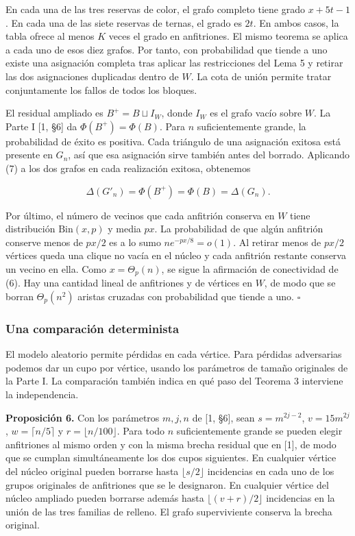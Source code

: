 \documentclass[spanish,11pt,a4paper]{article}
\begin{document}
En cada una de las tres reservas de color, el grafo completo tiene grado \(x+5t-1\). En cada una de las siete reservas de ternas, el grado es \(2t\). En ambos casos, la tabla ofrece al menos \(K\) veces el grado en anfitriones. El mismo teorema se aplica a cada uno de esos diez grafos. Por tanto, con probabilidad que tiende a uno existe una asignación completa tras aplicar las restricciones del Lema 5 y retirar las dos asignaciones duplicadas dentro de \(W\). La cota de unión permite tratar conjuntamente los fallos de todos los bloques.

El residual ampliado es \(B^+=B\sqcup I_W\), donde \(I_W\) es el grafo vacío sobre \(W\). La Parte I {[}1, §6{]} da \(\Phi(B^+)=\Phi(B)\). Para \(n\) suficientemente grande, la probabilidad de éxito es positiva. Cada triángulo de una asignación exitosa está presente en \(G_n\), así que esa asignación sirve también antes del borrado. Aplicando (7) a los dos grafos en cada realización exitosa, obtenemos

\[\Delta(G'_n)=\Phi(B^+)=\Phi(B)=\Delta(G_n).\]

Por último, el número de vecinos que cada anfitrión conserva en \(W\) tiene distribución \(\mathrm{Bin}(x,p)\) y media \(px\). La probabilidad de que algún anfitrión conserve menos de \(px/2\) es a lo sumo \(ne^{-px/8}=o(1)\). Al retirar menos de \(px/2\) vértices queda una clique no vacía en el núcleo y cada anfitrión restante conserva un vecino en ella. Como \(x=\Theta_p(n)\), se sigue la afirmación de conectividad de (6). Hay una cantidad lineal de anfitriones y de vértices en \(W\), de modo que se borran \(\Theta_p(n^2)\) aristas cruzadas con probabilidad que tiende a uno. \(\square\)

\subsubsection{Una comparación determinista}\label{una-comparaciuxf3n-determinista}

El modelo aleatorio permite pérdidas en cada vértice. Para pérdidas adversarias podemos dar un cupo por vértice, usando los parámetros de tamaño originales de la Parte I. La comparación también indica en qué paso del Teorema 3 interviene la independencia.

\textbf{Proposición 6.} Con los parámetros \(m,j,n\) de {[}1, §6{]}, sean \(s=m^{2j-2}\), \(v=15m^{2j}\), \(w=\lceil n/5\rceil\) y \(r=\lfloor n/100\rfloor\). Para todo \(n\) suficientemente grande se pueden elegir anfitriones al mismo orden y con la misma brecha residual que en {[}1{]}, de modo que se cumplan simultáneamente los dos cupos siguientes. En cualquier vértice del núcleo original pueden borrarse hasta \(\lfloor s/2\rfloor\) incidencias en cada uno de los grupos originales de anfitriones que se le designaron. En cualquier vértice del núcleo ampliado pueden borrarse además hasta \(\lfloor(v+r)/2\rfloor\) incidencias en la unión de las tres familias de relleno. El grafo superviviente conserva la brecha original.
\end{document}
